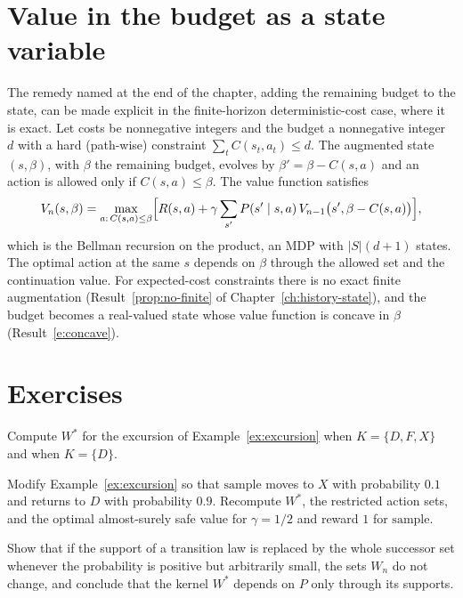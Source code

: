 \section{Value in the budget as a state variable}\label{sec:budget-state}

The remedy named at the end of the chapter, adding the remaining budget to the state, can be made explicit in the finite-horizon deterministic-cost case, where it is exact. Let costs be nonnegative integers and the budget a nonnegative integer $d$ with a hard (path-wise) constraint $\sum_tC(s_t,a_t)\le d$. The augmented state $(s,\beta)$, with $\beta$ the remaining budget, evolves by $\beta'=\beta-C(s,a)$ and an action is allowed only if $C(s,a)\le\beta$. The value function satisfies
\[
V_n(s,\beta)=\max_{a:\,C(s,a)\le\beta}\Bigl[R(s,a)+\gamma\sum_{s'}P(s'\mid s,a)\,V_{n-1}\bigl(s',\beta-C(s,a)\bigr)\Bigr],
\]
which is the Bellman recursion on the product, an MDP with $|S|(d+1)$ states. The optimal action at the same $s$ depends on $\beta$ through the allowed set and the continuation value. For expected-cost constraints there is no exact finite augmentation (Result~\ref{prop:no-finite} of Chapter~\ref{ch:history-state}), and the budget becomes a real-valued state whose value function is concave in $\beta$ (Result~\ref{e:concave}).

\section*{Exercises}

\begin{exercise}
Compute $W^{*}$ for the excursion of Example~\ref{ex:excursion} when $K=\{D,F,X\}$ and when $K=\{D\}$.
\end{exercise}

\begin{exercise}
Modify Example~\ref{ex:excursion} so that $\mathrm{sample}$ moves to $X$ with probability $0.1$ and returns to $D$ with probability $0.9$. Recompute $W^{*}$, the restricted action sets, and the optimal almost-surely safe value for $\gamma=1/2$ and reward $1$ for $\mathrm{sample}$.
\end{exercise}

\begin{exercise}
Show that if the support of a transition law is replaced by the whole successor set whenever the probability is positive but arbitrarily small, the sets $W_n$ do not change, and conclude that the kernel $W^{*}$ depends on $P$ only through its supports.\label{ex2:supports}
\end{exercise}

